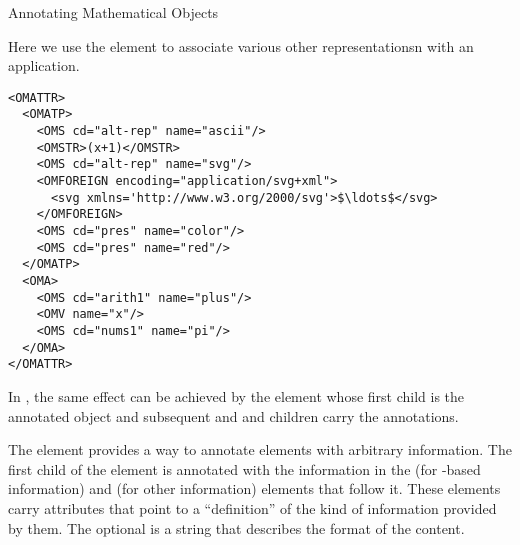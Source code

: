 \begin{omgroup}[id=mobj,short=Mathematical Objects]
\begin{omgroup}[id=annotating]{Annotating Mathematical Objects}
\begin{example}[id=omattr.ex]
  Here we use the  element to associate various other
  representationsn with an application.
\begin{lstlisting}[language=OpenMath,label=lst:omattr,mathescape,
                   caption={Associating Alternate Representations with an
                   {\openmath} Object},
                   numbers=none,index={OMATTR,OMATP}]
<OMATTR>
  <OMATP>
    <OMS cd="alt-rep" name="ascii"/>
    <OMSTR>(x+1)</OMSTR>
    <OMS cd="alt-rep" name="svg"/>
    <OMFOREIGN encoding="application/svg+xml">
      <svg xmlns='http://www.w3.org/2000/svg'>$\ldots$</svg>
    </OMFOREIGN>
    <OMS cd="pres" name="color"/>
    <OMS cd="pres" name="red"/>
  </OMATP>
  <OMA>
    <OMS cd="arith1" name="plus"/>
    <OMV name="x"/>
    <OMS cd="nums1" name="pi"/>
  </OMA>
</OMATTR>
\end{lstlisting}
\end{example}

In \cmathml, the same effect can be achieved by the  element
whose first child is the annotated object and subsequent 
and  and children carry the annotations.

\begin{definition}[id=semantics.def]
  The  element provides a way to annotate {\cmathml} elements
  with arbitrary information. The first child of the  element
  is annotated with the information in the {} (for
  {\xml}-based information) and {} (for other information)
  elements that follow it. These elements carry
   attributes that point to a
  ``definition'' of the kind of information provided by them. The optional
   is a string that describes the format of the
  content.
\end{definition}


\end{omgroup}
\end{omgroup}
